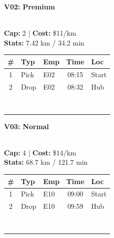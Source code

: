 \documentclass[a4paper,11pt]{article}
\begin{document}
\begin{minipage}[t]{0.24\textwidth}
    \centering
    \colorbox{velorablue}{\parbox{\dimexpr\linewidth-2\fboxsep}{\centering \color{white}\textbf{V02: Premium}}} \\
    \vspace{0.05cm}
    {\tiny \textbf{Cap:} 2 | \textbf{Cost:} \$11/km \\ \textbf{Stats:} 7.42 km / 34.2 min}
    \vspace{0.05cm}
    
    \renewcommand{\arraystretch}{0.9}
    \setlength{\tabcolsep}{1pt}
    \tiny
    \begin{tabular}{c l l c l}
        \toprule
        \textbf{\#} & \textbf{Typ} & \textbf{Emp} & \textbf{Time} & \textbf{Loc} \\
        \midrule
        1 & Pick & E02 & 08:15 & Start \\
        \rowcolor{headergray} 2 & Drop & E02 & 08:32 & Hub \\
        & & & & \\
        & & & & \\
        & & & & \\
        & & & & \\
        & & & & \\
        & & & & \\
        & & & & \\
        & & & & \\
        \bottomrule
    \end{tabular}
\end{minipage}
\hfill
\begin{minipage}[t]{0.24\textwidth}
    \centering
    \colorbox{velorablue}{\parbox{\dimexpr\linewidth-2\fboxsep}{\centering \color{white}\textbf{V03: Normal}}} \\
    \vspace{0.05cm}
    {\tiny \textbf{Cap:} 4 | \textbf{Cost:} \$14/km \\ \textbf{Stats:} 68.7 km / 121.7 min}
    \vspace{0.05cm}
    
    \renewcommand{\arraystretch}{0.9}
    \setlength{\tabcolsep}{1pt}
    \tiny
    \begin{tabular}{c l l c l}
        \toprule
        \textbf{\#} & \textbf{Typ} & \textbf{Emp} & \textbf{Time} & \textbf{Loc} \\
        \midrule
        1 & Pick & E10 & 09:00 & Start \\
        \rowcolor{headergray} 2 & Drop & E10 & 09:59 & Hub \\
        & & & & \\
        & & & & \\
        & & & & \\
        & & & & \\
        & & & & \\
        & & & & \\
        & & & & \\
        & & & & \\
        \bottomrule
    \end{tabular}
\end{minipage}
\end{document}
